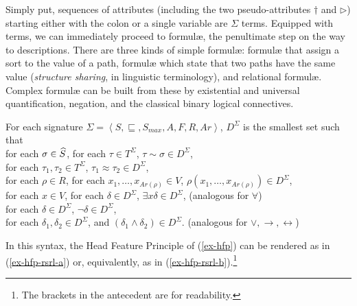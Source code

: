 \documentclass[output=paper
 	        ,biblatex
                ,babelshorthands
                ,newtxmath
                ,draftmode
                ,colorlinks, citecolor=brown
]{langscibook}
\begin{document}
{Simply put, sequences of attributes (including the two pseudo-attributes
$\dagger$ and $\triangleright$)
starting either with the colon or a single variable are $\Sigma$ terms.
Equipped with terms, we can immediately proceed to formul\ae, the penultimate
step on the way to descriptions.
There are three kinds of simple formul\ae: formulæ that assign a sort
to the value of a path, formulæ which state that two paths have the
same value (\emph{structure sharing}, in linguistic terminology), and
relational formul\ae. Complex formulæ can be built from these by existential
and universal quantification, negation, and the classical binary logical
connectives.

\begin{mydef}
  For each signature $\Sigma=\left<S,\sqsubseteq,S_{max},A,F,R,Ar\right>$,
  $D^{\Sigma}$ is the smallest set such that\\
  for each $\sigma\in\widehat{S}$, for each $\tau\in T^{\Sigma}$,
  $\tau\sim\sigma\in D^{\Sigma}$,\\
  for each $\tau_1, \tau_2\in T^{\Sigma}$, $\tau_1 \approx \tau_2 \in D^{\Sigma}$,\\
  for each $\rho\in R$, for each $x_1, \ldots, x_{Ar(\rho)}\in V$,
  $\rho(x_1,\ldots,x_{Ar(\rho)})\in D^{\Sigma}$,\\
  for each $x\in V$, for each $\delta\in D^{\Sigma}$,
  $\exists x\delta\in D^{\Sigma}$, \hfill (analogous for $\forall$)\\
  for each $\delta\in D^{\Sigma}$, $\neg\delta\in D^{\Sigma}$,\\
  for each $\delta_1,\delta_2\in D^{\Sigma}$, and
  $\left(\delta_1\land\delta_2\right) \in D^{\Sigma}$.
  \hfill (analogous for $\lor,\rightarrow,\leftrightarrow$)
\end{mydef}

In this syntax, the Head Feature Principle of (\ref{ex-hfp}) can be
rendered as in (\ref{ex-hfp-rsrl-a}) or, equivalently, as in
(\ref{ex-hfp-rsrl-b}).\footnote{The brackets in the antecedent are
for readability.}

}
\end{document}
